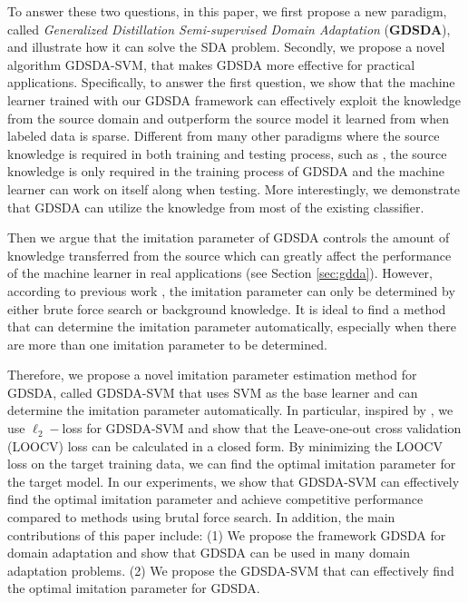 To answer these two questions, in this paper, we first propose a new paradigm, called \textit{Generalized Distillation Semi-supervised Domain Adaptation} (\textbf{GDSDA}), and illustrate how it can solve the SDA problem. Secondly, we propose a novel algorithm GDSDA-SVM, that makes GDSDA more effective for practical applications. Specifically, to answer the first question, we show that the machine learner trained with our GDSDA framework can effectively exploit the knowledge from the source domain and outperform the source model it learned from when labeled data is sparse.
Different from many other paradigms where the source knowledge is required in both training and testing process, such as \cite{kuzborskij2013stability}, the source knowledge is only required in the training process of GDSDA and the machine learner can work on itself along when testing. More interestingly, we demonstrate that GDSDA can utilize the knowledge from most of the existing classifier.

Then we argue that the imitation parameter of GDSDA controls the amount of knowledge transferred from the source which can greatly affect the performance of the machine learner in real applications (see Section \ref{sec:gdda}).
However, according to previous work \cite{lopez2015unifying,Tzeng_2015_ICCV}, the imitation parameter can only be determined by either brute force search or background knowledge. It is ideal to find a method that can determine the imitation parameter automatically, especially when there are more than one imitation parameter to be determined.

Therefore, we propose a novel imitation parameter estimation method for GDSDA, called GDSDA-SVM that uses SVM as the base learner and can determine the imitation parameter automatically. In particular, inspired by \cite{cawley2006leave}, we use $\ell_2-$loss for GDSDA-SVM and show that the Leave-one-out cross validation (LOOCV) loss can be calculated in a closed form. By minimizing the LOOCV loss on the target training data, we can find the optimal imitation parameter for the target model. In our experiments, we show that GDSDA-SVM can effectively find the optimal imitation parameter and achieve competitive performance compared to methods using brutal force search. In addition, the main contributions of this paper include: (1) We propose the framework GDSDA for domain adaptation and show that GDSDA can be used in many domain adaptation problems. (2) We propose the GDSDA-SVM that can effectively find the optimal imitation parameter for GDSDA.

